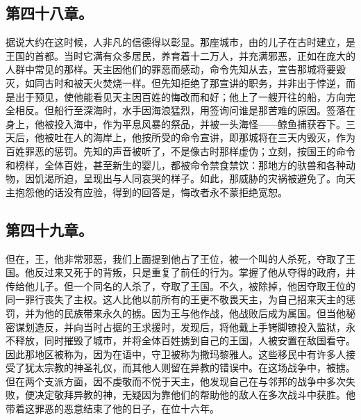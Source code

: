 
\subsection{第四十八章。}

据说大约在这时候，人非凡的信德得以彰显。那座城市，由的儿子在古时建立，是王国的首都。当时它满有众多居民，养育着十二万人，并充满邪恶，正如在庞大的人群中常见的那样。天主因他们的罪恶而感动，命令先知从去，宣告那城将要毁灭，如同古时和被天火焚烧一样。但先知拒绝了那宣讲的职务，并非出于悖逆，而是出于预见，使他能看见天主因百姓的悔改而和好；他上了一艘开往的船，方向完全相反。但船行至深海时，水手因海浪猛烈，用签询问谁是那苦难的原因。签落在身上，他被投入海中，作为平息风暴的祭品，并被一头海怪——鲸鱼捕获吞下。三天后，他被吐在人的海岸上，他按所受的命令宣讲，即那城将在三天内毁灭，作为百姓罪恶的惩罚。先知的声音被听了，不是像古时那样虚伪；立刻，按国王的命令和榜样，全体百姓，甚至新生的婴儿，都被命令禁食禁饮：那地方的驮兽和各种动物，因饥渴所迫，呈现出与人同哀哭的样子。如此，那威胁的灾祸被避免了。向天主抱怨他的话没有应验，得到的回答是，悔改者永不蒙拒绝宽恕。\par


\subsection{第四十九章。}

但在，王，他非常邪恶，我们上面提到他占了王位，被一个叫的人杀死，夺取了王国。他反过来又死于的背叛，只是重复了前任的行为。掌握了他从夺得的政府，并传给他儿子。但一个同名的人杀了，夺取了王国。不久，被除掉，他因夺取王位的同一罪行丧失了主权。这人比他以前所有的王更不敬畏天主，为自己招来天主的惩罚，并为他的民族带来永久的掳。因为王与他作战，他战败后成为属国。但当他秘密谋划造反，并向当时占据的王求援时，发现后，将他戴上手铐脚镣投入监狱，永不释放，同时摧毁了城市，并将全体百姓掳到自己的王国，人被安置在敌国看守。因此那地区被称为，因为在语中，守卫被称为撒玛黎雅人。这些移民中有许多人接受了犹太宗教的神圣礼仪，而其他人则留在异教的错误中。在这场战争中，被掳。但在两个支派方面，因不虔敬而不悦于天主，他发现自己在与邻邦的战争中多次失败，便决定敬拜异教的神，无疑因为靠他们的帮助他的敌人在多次战斗中获胜。他带着这罪恶的恶意结束了他的日子，在位十六年。\par

